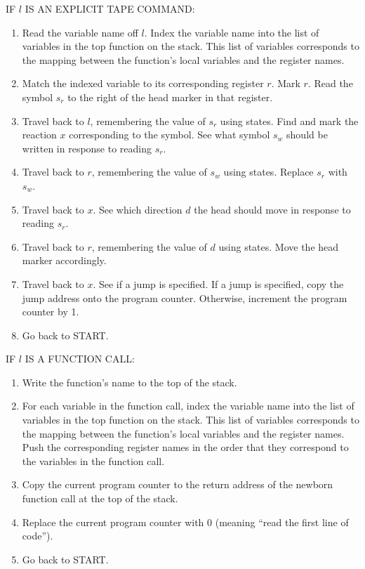 \documentclass[11pt]{article}
\begin{document}
IF $l$ IS AN EXPLICIT TAPE COMMAND:
\begin{enumerate}
\item Read the variable name off $l$. Index the variable name into the list of variables in the top function on the stack. This list of variables corresponds to the mapping between the function's local variables and the register names.
\item Match the indexed variable to its corresponding register $r$. Mark $r$. Read the symbol $s_r$ to the right of the head marker in that register.
\item Travel back to $l$, remembering the value of $s_r$ using states. Find and mark the reaction $x$ corresponding to the symbol. See what symbol $s_w$ should be written in response to reading $s_r$.
\item Travel back to $r$, remembering the value of $s_w$ using states. Replace $s_r$ with $s_w$.
\item Travel back to $x$. See which direction $d$ the head should move in response to reading $s_r$.
\item Travel back to $r$, remembering the value of $d$ using states. Move the head marker accordingly.
\item Travel back to $x$. See if a jump is specified. If a jump is specified, copy the jump address onto the program counter. Otherwise, increment the program counter by 1.
\item Go back to START.
\end{enumerate}

IF $l$ IS A FUNCTION CALL:
\begin{enumerate}
\item Write the function's name to the top of the stack.
\item For each variable in the function call, index the variable name into the list of variables in the top function on the stack. This list of variables corresponds to the mapping between the function's local variables and the register names. Push the corresponding register names in the order that they correspond to the variables in the function call. 
\item Copy the current program counter to the return address of the newborn function call at the top of the stack.
\item Replace the current program counter with 0 (meaning ``read the first line of code'').
\item Go back to START.
\end{enumerate}
\end{document}
